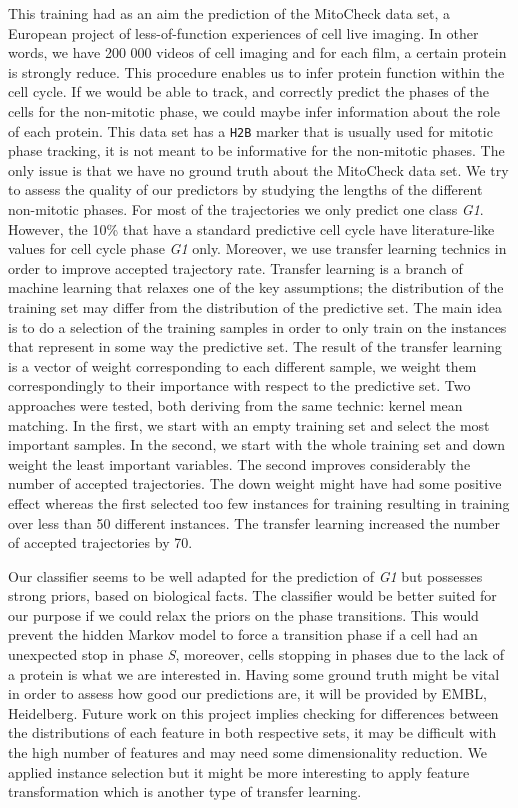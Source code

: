 \documentclass{article}
\begin{document}
This training had as an aim the prediction of the MitoCheck data set, a European project of less-of-function experiences of cell live imaging. In other words, we have 200 000 videos of cell imaging and for each film, a certain protein is strongly reduce. This procedure enables us to infer protein function within the cell cycle. If we would be able to track, and correctly predict the phases of the cells for the non-mitotic phase, we could maybe infer information about the role of each protein. This data set has a \texttt{H2B} marker that is usually used for mitotic phase tracking, it is not meant to be informative for the non-mitotic phases. The only issue is that we have no ground truth about the MitoCheck data set. We try to assess the quality of our predictors by studying the lengths of the different non-mitotic phases. For most of the trajectories we only predict one class \textit{G1}. However, the 10\% that have a standard predictive cell cycle have literature-like values for cell cycle phase \textit{G1} only. Moreover, we use transfer learning technics in order to improve accepted trajectory rate. Transfer learning is a branch of machine learning that relaxes one of the key assumptions; the distribution of the training set may differ from the distribution of the predictive set. The main idea is to do a selection of the training samples in order to only train on the instances that represent in some way the predictive set. The result of the transfer learning is a vector of weight corresponding to each different sample, we weight them correspondingly to their importance with respect to the predictive set. Two approaches were tested, both deriving from the same technic: kernel mean matching. In the first, we start with an empty training set and select the most important samples. In the second, we start with the whole training set and down weight the least important variables. The second improves considerably the number of accepted trajectories. The down weight might have had some positive effect whereas the first selected too few instances for training resulting in training over less than 50 different instances. The transfer learning increased the number of accepted trajectories by 70.

\bigskip 

Our classifier seems to be well adapted for the prediction of \textit{G1} but possesses strong priors, based on biological facts. The classifier would be better suited for our purpose if we could relax the priors on the phase transitions. This would prevent the hidden Markov model to force a transition phase if a cell had an unexpected stop in phase \textit{S}, moreover, cells stopping in phases due to the lack of a protein is what we are interested in. Having some ground truth might be vital in order to assess how good our predictions are, it will be provided by EMBL, Heidelberg. Future work on this project implies checking for differences between the distributions of each feature in both respective sets, it may be difficult with the high number of features and may need some dimensionality reduction. We applied instance selection but it might be more interesting to apply feature transformation which is another type of transfer learning.
\end{document}
